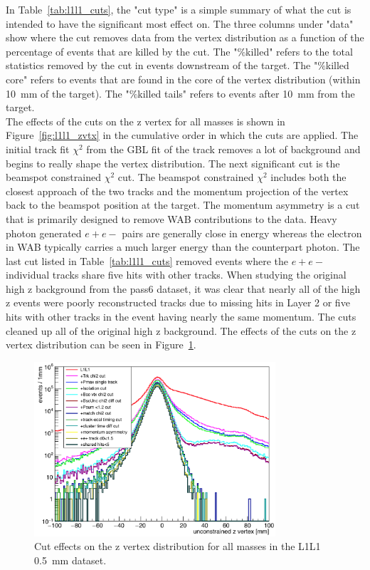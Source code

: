 \documentclass[twoside]{article}
\begin{document}
In Table~\ref{tab:l1l1_cuts}, the "cut type" is a simple summary of what the cut is intended to have the significant most effect on. The three columns under "data" show where the cut removes data from the vertex distribution as a function of the percentage of events that are killed by the cut. The "$\%$killed" refers to the total statistics removed by the cut in events downstream of the target. The "$\%$killed core" refers to events that are found in the core of the vertex distribution (within 10~mm of the target). The "$\%$killed tails" refers to events after 10~mm from the target. \\
\indent The effects of the cuts on the z vertex for all masses is shown in Figure~\ref{fig:l1l1_zvtx} in the cumulative order in which the cuts are applied. The initial track fit $\chi^{2}$ from the GBL fit of the track removes a lot of background and begins to really shape the vertex distribution. The next significant cut is the beamspot constrained $\chi^{2}$ cut. The beamspot constrained $\chi^{2}$ includes both the closest approach of the two tracks and the momentum projection of the vertex back to the beamspot position at the target. The momentum asymmetry is a cut that is primarily designed to remove WAB contributions to the data. Heavy photon generated $e+e-$ pairs are generally close in energy whereas the electron in WAB typically carries a much larger energy than the counterpart photon. 
\indent The last cut listed in Table~\ref{tab:l1l1_cuts} removed events where the $e+e-$ individual tracks share five hits with other tracks. When studying the original high z background from the pass6 dataset, it was clear that nearly all of the high z events were poorly reconstructed tracks due to missing hits in Layer 2 or five hits with other tracks in the event having nearly the same momentum. The cuts cleaned up all of the original high z background. The effects of the cuts on the z vertex distribution can be seen in Figure~\ref{fig:l1l1_vtx}.

\begin{figure}[H]
  \centering
      \includegraphics[width=0.8\textwidth]{plots/L1L1_zvtx.png}
  \caption{Cut effects on the z vertex distribution for all masses in the L1L1 0.5~mm dataset.}
  \label{fig:l1l1_vtx}
\end{figure} 
\end{document}
